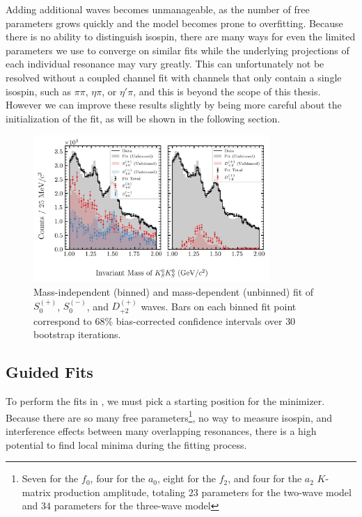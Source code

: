 Adding additional waves becomes unmanageable, as the number of free parameters grows quickly and the model becomes prone to overfitting. Because there is no ability to distinguish isospin, there are many ways for even the limited parameters we use to converge on similar fits while the underlying projections of each individual resonance may vary greatly. This can unfortunately not be resolved without a coupled channel fit with channels that only contain a single isospin, such as $\pi\pi$, $\eta\pi$, or $\eta'\pi$, and this is beyond the scope of this thesis. However we can improve these results slightly by being more careful about the initialization of the fit, as will be shown in the following section.

\begin{figure}
  \begin{center}
    \includegraphics[width=0.8\textwidth]{figures/binned_and_unbinned_fit_chisqdof_3.4_splot_D_1s_2b_phase_factor_waves29099_uncertainty_bootstrap-SE.png}
  \end{center}
  \caption{Mass-independent (binned) and mass-dependent (unbinned) fit of $S_{0}^{(+)}$, $S_{0}^{(-)}$, and $D_{+2}^{(+)}$ waves. Bars on each binned fit point correspond to $68\%$ bias-corrected confidence intervals over $ 30 $ bootstrap iterations.}\label{fig:unbinned-fit-chisqdof-3.4-Spn-D2p}
\end{figure}

\subsection{Guided Fits}\label{sub:guided-fits}

To perform the fits in , we must pick a starting position for the minimizer. Because there are so many free parameters\footnote{Seven for the $f_0$, four for the $a_0$, eight for the $f_2$, and four for the $a_2$ $K$-matrix production amplitude, totaling $23$ parameters for the two-wave model and $34$ parameters for the three-wave model}, no way to measure isospin, and interference effects between many overlapping resonances, there is a high potential to find local minima during the fitting process.

